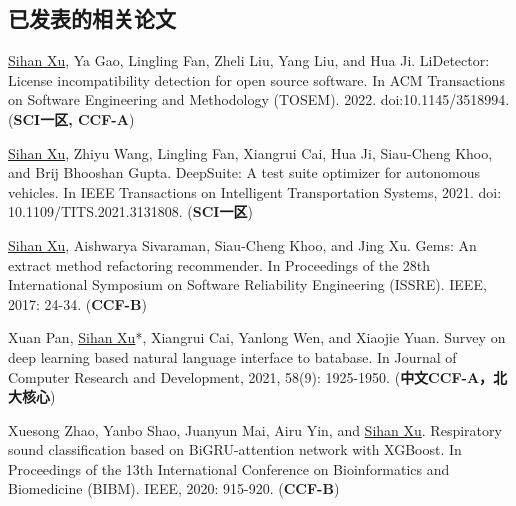 \documentclass[a4paper,zihao=-4]{article}
\begin{document}
\subsection{已发表的相关论文}

\begin{enumerate}[label={[\arabic*]}]

	\item \underline{Sihan Xu}, Ya Gao, Lingling Fan, Zheli Liu, Yang Liu, and
	Hua Ji. LiDetector: License incompatibility detection for open source
	software. In ACM Transactions on Software Engineering and Methodology
	(TOSEM). 2022. doi:10.1145/3518994. (\textbf{SCI一区, CCF-A})

	\item \underline{Sihan Xu}, Zhiyu Wang, Lingling Fan, Xiangrui Cai, Hua Ji,
	Siau-Cheng Khoo, and Brij Bhooshan Gupta. DeepSuite: A test suite optimizer
	for autonomous vehicles. In IEEE Transactions on Intelligent Transportation
	Systems, 2021. doi: 10.1109/TITS.2021.3131808. (\textbf{SCI一区})
	
	\item \underline{Sihan Xu}, Aishwarya Sivaraman, Siau-Cheng Khoo, and Jing
	Xu. Gems: An extract method refactoring recommender. In Proceedings of the
	28th International Symposium on Software Reliability Engineering (ISSRE).
	IEEE, 2017: 24-34. (\textbf{CCF-B})

	\iffalse
	\item \underline{Sihan Xu}, Ya Gao, Xiangrui Cai, Zhiyu Wang, and Hua Ji.
Effective Multi-Fault Localization Based on Fault-Relevant Statistics. In
Proceedings of the 45th Annual Computers, Software, and Applications Conference
(COMPSAC). IEEE, 2021: 998-1003. (\textbf{CCF-C})

	\item \underline{Sihan Xu}, Sen Zhang, Weijing Wang, Xinya Cao, Chenkai Guo,
	and Jing Xu. Method name suggestion with hierarchical attention
	networks[C]//Proceedings of the 2019 ACM SIGPLAN Workshop on Partial
	Evaluation and Program Manipulation (PEPM). 2019: 10-21. (\textbf{CCF-C})
    \fi

	\item Xuan Pan, \underline{Sihan Xu}*, Xiangrui Cai, Yanlong Wen, and
	Xiaojie Yuan. Survey on deep learning based natural language interface to
	batabase. In Journal of Computer Research and Development, 2021, 58(9):
	1925-1950. (\textbf{中文CCF-A，北大核心})

	\item Xuesong Zhao, Yanbo Shao, Juanyun Mai, Airu Yin, and \underline{Sihan
	Xu}. Respiratory sound classification based on BiGRU-attention network with
	XGBoost. In Proceedings of the 13th International Conference on
	Bioinformatics and Biomedicine (BIBM). IEEE, 2020: 915-920. (\textbf{CCF-B})


\end{enumerate}
\end{document}
